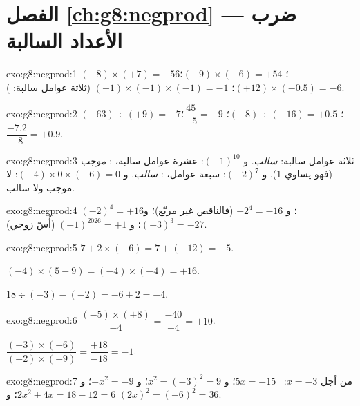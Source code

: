\section*{الفصل \ref{ch:g8:negprod} --- ضرب الأعداد السالبة}

\begin{solution}{exo:g8:negprod:1}
$(-8) \times (+7) = -56$؛ \quad
$(-9) \times (-6) = +54$؛ \quad
$(+12) \times (-0.5) = -6$؛ \quad
$(-1) \times (-1) \times (-1) = -1$ (ثلاثة عوامل سالبة: ).
\end{solution}

\begin{solution}{exo:g8:negprod:2}
$(-63) \div (+9) = -7$؛ \quad
$(-8) \div (-16) = +0.5$؛ \quad
$\dfrac{45}{-5} = -9$؛ \quad
$\dfrac{-7.2}{-8} = +0.9$.
\end{solution}

\begin{solution}{exo:g8:negprod:3}
ثلاثة عوامل سالبة: \emph{سالب}. \quad
و $(-1)^{10}$: عشرة عوامل سالبة، : \emph{موجب} (فهو يساوي
$1$). \quad
و $(-2)^7$: سبعة عوامل، : \emph{سالب}. \quad
و $(-4) \times 0 \times (-6) = 0$: لا موجب ولا سالب.
\end{solution}

\begin{solution}{exo:g8:negprod:4}
$(-2)^4 = +16$؛ \quad و $-2^4 = -16$ (فالناقص غير مربّع)؛ \quad
و $(-3)^3 = -27$؛ \quad و $(-1)^{2026} = +1$ (أُسّ زوجي).
\end{solution}

\begin{solution}{exo:g8:negprod:5}
$7 + 2 \times (-6) = 7 + (-12) = -5$.

$(-4) \times (5 - 9) = (-4) \times (-4) = +16$.

$18 \div (-3) - (-2) = -6 + 2 = -4$.
\end{solution}

\begin{solution}{exo:g8:negprod:6}
$\dfrac{(-5) \times (+8)}{-4} = \dfrac{-40}{-4} = +10$.

$\dfrac{(-3) \times (-6)}{(-2) \times (+9)} = \dfrac{+18}{-18} = -1$.
\end{solution}

\begin{solution}{exo:g8:negprod:7}
من أجل $x = -3$: \ $5x = -15$؛ \quad و $x^2 = (-3)^2 = 9$؛ \quad
و $-x^2 = -9$؛ \quad و $2x^2 + 4x = 18 - 12 = 6$؛ \quad
و $(2x)^2 = (-6)^2 = 36$.
\end{solution}

